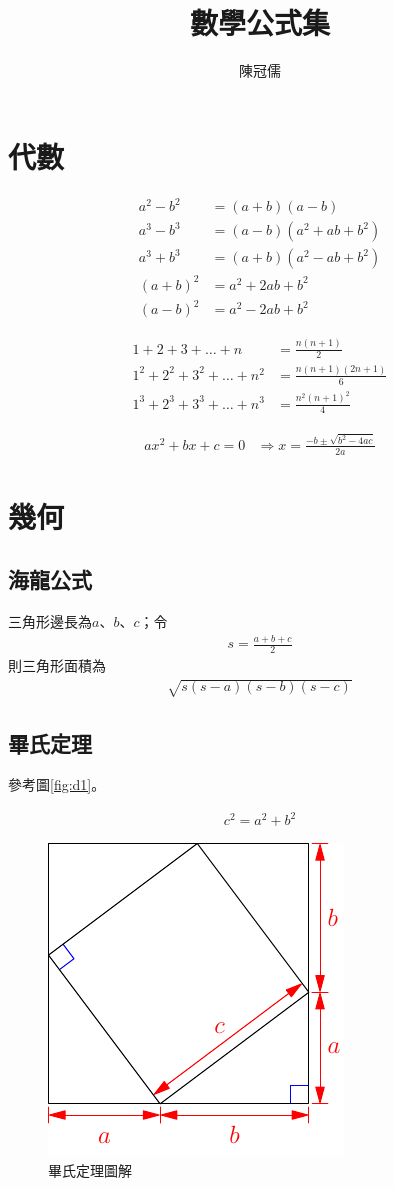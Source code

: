 \documentclass[12pt,a4paper]{article}
\begin{document}
\title{數學公式集}
\author{陳冠儒}
\maketitle

\section{代數}
\begin{align}
  a^2 - b^2 &= (a + b)(a - b)\\
  a^3 - b^3 &= (a - b)(a^2 + ab + b^2)\\
  a^3 + b^3 &= (a + b)(a^2 - ab + b^2)\\
  (a + b)^2 &= a^2 + 2ab + b^2\\
  (a - b)^2 &= a^2 - 2ab + b^2
\end{align}

\begin{align}
  1 + 2 + 3 + \dots + n &= \frac{n(n+1)}{2} \\
  1^2 + 2^2 + 3^2 + \dots + n^2 &= \frac{n(n+1)(2n+1)}{6} \\
  1^3 + 2^3 + 3^3 + \dots + n^3 &= \frac{n^2(n+1)^2}{4}
\end{align}

\begin{align}
  a x^2 + b x + c = 0 &\Longrightarrow x = \frac{-b \pm\sqrt{b^2 - 4 a c}}{2 a}
\end{align}

\section{幾何}
\subsection{海龍公式}
三角形邊長為$a$、$b$、$c$；令
\begin{align*}
  s=\frac{a+b+c}{2}
\end{align*}
則三角形面積為
\begin{align*}
  \sqrt{s(s-a)(s-b)(s-c)}
\end{align*}

\subsection{畢氏定理}

參考圖\eqref{fig:d1}。

\begin{align*}
  c^2 = a^2 + b^2
\end{align*}

\begin{figure}
\centering
  \includegraphics{pythagora.pdf}
\caption{畢氏定理圖解}
\label{fig:d1}
\end{figure}
\end{document}
